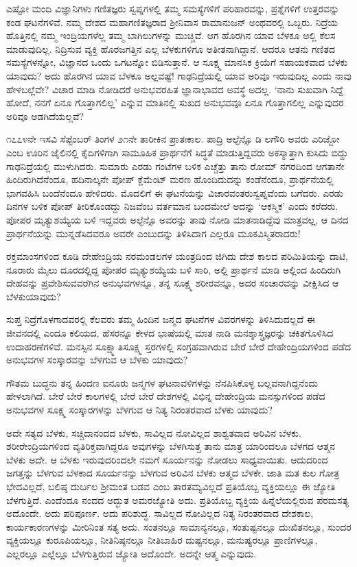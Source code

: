 ಎಷ್ಟೋ ಮಂದಿ ವಿಜ್ಞಾನಿಗಳು ಗಣಿತಜ್ಞರು ಸ್ವಪ್ನಗಳಲ್ಲಿ ತಮ್ಮ ಸಮಸ್ಯೆಗಳಿಗೆ ಪರಿಹಾರವನ್ನು, ಪ್ರಶ್ನೆಗಳಿಗೆ ಉತ್ತರವನ್ನು ಕಂಡ ಘಟನೆಗಳಿವೆ. ನಮ್ಮ ದೇಶದ ಮಹಾಗಣಿತಜ್ಞರಾದ ಶ‍್ರೀನಿವಾಸ ರಾಮಾನುಜನ್ ಅಂಥವರಲ್ಲಿ ಒಬ್ಬರು. ನಿದ್ರೆಯ ಹೊತ್ತಿನಲ್ಲಿ ನಮ್ಮ ಇಂದ್ರಿಯಗಳೆಲ್ಲ ತಮ್ಮ ಬಾಗಿಲುಗಳನ್ನು ಮುಚ್ಚಿವೆ. ಆಗ ಹೊರಗಿನ ಯಾವ ಬೆಳಕೂ ಅಲ್ಲಿ ಕೆಲಸ ಮಾಡುವುದಿಲ್ಲ. ನಿದ್ರಿಸುವ ವ್ಯಕ್ತಿ ಹೊರಜಗತ್ತಿನ ಎಲ್ಲ ಬೆಳಕುಗಳಿಗೂ ಅತೀತನಾಗಿದ್ದಾನೆ. ಆದರೂ ಆತನು ಗಣಿತದ ಸಮಸ್ಯೆಗಳನ್ನೋ, ವಿಜ್ಞಾನದ ಒಂದು ಒಗಟನ್ನೋ ಬಿಡಿಸುತ್ತಾನೆ. ಆ ಸೂಕ್ಷ್ಮ ಮಾನಸಿಕ ಕ್ರಿಯೆಗೆ ಸಹಾಯಕವಾದ ಬೆಳಕು ಯಾವುದು? ಅದು ಹೊರಗಿನ ಯಾವ ಬೆಳಕೂ ಅಲ್ಲವಷ್ಟೆ! ಗಾಢನಿದ್ರೆಯಲ್ಲಿ ಯಾವ ಅರಿವೂ ಇರುವುದಿಲ್ಲ ಎಂದು ನಾವು ಹೇಳಬಲ್ಲೆವೇ? ವಿಚಾರ ಮಾಡಿ ನೋಡಿದರೆ ಅನುಭವರಹಿತ ಜ್ಞಾನಾಭಾವದ ಅವಸ್ಥೆ ಅದಲ್ಲ. ‘ನಾನು ಸುಖವಾಗಿ ನಿದ್ದೆ ಹೋದೆ, ನನಗೆ ಏನೂ ಗೊತ್ತಾಗಲಿಲ್ಲ’ ಎನ್ನುವ ಮಾತಿನಲ್ಲಿ ಸುಖದ ಅನುಭವವೂ ಏನೂ ಗೊತ್ತಾಗಲಿಲ್ಲ ಎನ್ನುವುದರ ಅರಿವೂ ಅಡಗಿದೆಯಲ್ಲವೆ?

೧೭೭೪ನೇ ಇಸವಿ ಸೆಪ್ಟೆಂಬರ್ ತಿಂಗಳ ೨೧ನೇ ತಾರೀಕಿನ ಪ್ರಾತಃಕಾಲ. ಪಾದ್ರಿ ಅಲ್ಫೆನ್ಸೊ ಡಿ ಲಗೌರಿ ಅವರು ಎರಿಜ್ಜೋ ಎಂಬ ಊರಿನ ಜೈಲಿನಲ್ಲಿ ಕೈದಿಗಳಿಗಾಗಿ ಸಾಮೂಹಿಕ ಪ್ರಾರ್ಥನೆಗೆ ಸಿದ್ಧತೆ ಮಾಡುತ್ತಿದ್ದವರು ಅಕಸ್ಮಾತ್ತಾಗಿ ಕುಸಿದು ಬಿದ್ದು ಗಾಢನಿದ್ರೆಯಲ್ಲಿ ಮುಳುಗಿದರು. ಸುಮಾರು ಎರಡು ಗಂಟೆಗಳ ಬಳಿಕ ಎಚ್ಚೆತ್ತು ತಾನು ರೋಮ್ ನಗರದಿಂದ ಆಗತಾನೇ ಹಿಂದಿರುಗಿದೆ\-ನೆಂದೂ, ಹದಿನಾಲ್ಕನೇ ಪೋಪ್ ಕ್ಲೆಮೆಂಟ್ ಮರಣ ಹೊಂದಿದುದನ್ನು ಕಂಡೆನೆಂದೂ, ಪ್ರಾರ್ಥನೆಯಲ್ಲಿ ಭಾಗವಹಿಸಿ ಬಂದೆನೆಂದೂ ಹೇಳಿದರು. ಮೊದಲಿಗೆ ಈ ಘಟನೆಯನ್ನು ವಿಚಾರವಂತರು\break ಸ್ವಪ್ನವೆಂದು ಬಗೆದರು. ಎರಡು ದಿನಗಳ ಬಳಿಕ ಪೋಪ್ ತೀರಿಕೊಂಡದ್ದು ನಿಜವೆಂಬ ವರ್ತಮಾನ ಬಂದಮೇಲೆ ಅದನ್ನು ‘ಆಕಸ್ಮಿಕ’ ಎಂದು ಕರೆದರು. ಪೋಪರ ಮೃತ್ಯುಶಯ್ಯೆಯ ಬಳಿ ಇದ್ದವರು ಅಲ್ಫೆನ್ಸೊ ಅವರನ್ನು ತಾವು ನೋಡಿ ಮಾತನಾಡಿದ್ದೆವು ಮಾತ್ರವಲ್ಲ, ಆ ದಿನದ ಪ್ರಾರ್ಥನೆಯನ್ನು ಮುನ್ನಡೆಸಿದವರೂ ಅವರೇ ಎಂಬುದನ್ನು ತಿಳಿಸಿದಾಗ ಎಲ್ಲರೂ ಮೂಕವಿಸ್ಮಿತರಾದರು!

ರಕ್ತಮಾಂಸಗಳಿಂದ ಕೂಡಿ ದೇಹೇಂದ್ರಿಯ ನರಮಂಡಲಗಳ ಯಂತ್ರದಿಂದ ಜಿಗಿದು ದೇಶ ಕಾಲದ ಪರಿಮಿತಿಯನ್ನು ದಾಟಿ, ನೂರಾರು ಮೈಲು ದೂರದಲ್ಲಿದ್ದ ಪೋಪರ ಮೃತ್ಯುಶಯ್ಯೆಯ ಬಳಿ ಸಾರಿ, ಅಲ್ಲಿ ಪ್ರಾರ್ಥನೆ ಮಾಡಿ ಅಲ್ಲಿಂದ ಹಿಂದಿರುಗಿ ದೇಹವನ್ನು ಪ್ರವೇಶಿಸುವವರೆಗಿನ ಅನುಭವಗಳನ್ನೂ, ತನ್ನ ಸೂಕ್ಷ್ಮ ಶರೀರವನ್ನೂ, ಅದರ ಸಂಚಾರವನ್ನು ವೀಕ್ಷಿಸಿದ ಆ ಬೆಳಕು\break ಯಾವುದು?

ಸುಪ್ತ ನಿದ್ರೆಗೊಳಗಾದವರಲ್ಲಿ ಕೆಲವರು ತಮ್ಮ ಹಿಂದಿನ ಜನ್ಮದ ಘಟನೆಗಳ ವಿವರಗಳನ್ನು ತಿಳಿಸಿದುದಲ್ಲದೆ ಈ ಜೀವನದಲ್ಲಿ ಎಂದೂ ಕಲಿಯದ, ಹೆಸರನ್ನೂ ಕೇಳದ ಭಾಷೆಯಲ್ಲಿ ಮಾತ ನಾಡಿ ಮನಶ್ಶಾಸ್ತ್ರಜ್ಞರನ್ನು ಚಕಿತಗೊಳಿಸಿದ ಉದಾಹರಣೆಗಳಿವೆ. ಮನಸ್ಸಿನ ಸೂಕ್ಷ್ಮಾತಿಸೂಕ್ಷ್ಮ ಸ್ತರಗಳಲ್ಲಿ ಸಂಗ್ರಹವಾಗಿರುವ ಬೇರೆ ಬೇರೆ ದೇಹೇಂದ್ರಿಯಗಳಿಂದ ಪಡೆದ ಅನುಭವಗಳ ಸಂಸ್ಕಾರವನ್ನು ಬೆಳಗುವ ಆ ಬೆಳಕು ಯಾವುದು?

ಗೌತಮ ಬುದ್ಧನು ತನ್ನ ಹಿಂದಣ ಐನೂರು ಜನ್ಮಗಳ ಘಟನಾವಳಿಗಳನ್ನು ನೆನಪಿಸಿಕೊಳ್ಳ ಬಲ್ಲವನಾಗಿದ್ದನೆಂದು ಹೇಳಲಾಗಿದೆ. ಬೇರೆ ಬೇರೆ ಕಾಲಗಳಲ್ಲಿ ಬೇರೆ ಬೇರೆ ದೇಶಗಳಲ್ಲಿ ವಿಭಿನ್ನ ದೇಹೇಂದ್ರಿಯ ಮನಸ್ಸುಗಳಿಂದ ಪಡೆದ ಅನುಭವಗಳ ಸೂಕ್ಷ್ಮ ಸಂಸ್ಕಾರಗಳನ್ನು ಬೆಳಗುವ ಆ ನಿತ್ಯ ನಿರಂತರವಾದ ಬೆಳಕು ಯಾವುದು?

ಅದೇ ಸತ್ಯದ ಬೆಳಕು, ಸಚ್ಚಿದಾನಂದದ ಬೆಳಕು, ಸಾವಿಲ್ಲದ ನೋವಿಲ್ಲದ ಶಾಶ್ವತವಾದ ಅರಿವಿನ ಬೆಳಕು. ಶರೀರೇಂದ್ರಿಯಗಳಿಂದ ವ್ಯತಿರಿಕ್ತವಾಗಿದ್ದರೂ ಅವುಗಳನ್ನು ಬೆಳಗಿಸುತ್ತ ತಾನು ಮಾತ್ರ ಯಾರಿಂದಲೂ ಬೆಳಗದ ಆತ್ಮನ ಬೆಳಕು ಅದೇ. ಆ ಬೆಳಕು ಇರುವುದರಿಂದಲೇ ನಮಗೆ ಸೂರ್ಯನನ್ನು ನೋಡಲು ಸಾಧ್ಯವಾಯಿತು. ಆದುದರಿಂದ ಜಗತ್ತನ್ನು ಬೆಳಗುವ ಬೆಳಕಾದ ಸೂರ್ಯನನ್ನು ಬೆಳಗುವ ಅರಿವಿನ ಬೆಳಕು ಆತ್ಮದ ಬೆಳಕೇ. ಜಾತಿ ಮತ ಕುಲ ಗೋತ್ರ ಭೇದವಿಲ್ಲದೆ, ಬಲಿಷ್ಠ ದುರ್ಬಲ ಶ‍್ರೀಮಂತ ಬಡವ ಎಂಬ ತಾರತಮ್ಯವಿಲ್ಲದೆ ಪ್ರತಿಯೊಬ್ಬ ವ್ಯಕ್ತಿಯಲ್ಲೂ ಈ ಜ್ಯೋತಿ ಬೆಳಗುತ್ತಿದೆ. ಎಂದೆಂದೂ ನಂದದ ಅದ್ಭುತ ಅಮರಜ್ಯೋತಿ ಅದು. ಪ್ರತಿಯೊಬ್ಬ ವ್ಯಕ್ತಿಯ ಹಿನ್ನೆಲೆಯಲ್ಲಿರುವ ಪರಮಸತ್ಯ ಅದೊಂದೇ. ಅದು ಪರಿಪೂರ್ಣ. ಅದು ಪರಿಶುದ್ಧ. ಸಾವಿಲ್ಲದ ನೋವಿಲ್ಲದ ನಿತ್ಯ ನಿರಂತರವಾದ ದೇಶಕಾಲ, ಕಾರ್ಯಕಾರಣಗಳನ್ನು ಮೀರಿನಿಂತ ಸತ್ಯ ಅದು. ಸಂತನಲ್ಲೂ ಸಾಮಾನ್ಯನಲ್ಲೂ, ಸಂತುಷ್ಟನಲ್ಲೂ ದುಃಖಿತನಲ್ಲೂ, ಸುಂದರ ವ್ಯಕ್ತಿ\-ಯಲ್ಲೂ ಕುರೂಪಿಯಲ್ಲೂ, ನೀತಿನಿಷ್ಠನಲ್ಲೂ ನೀತಿಬಾಹಿರ ದುಷ್ಟನಲ್ಲೂ, ಮನುಷ್ಯರಲ್ಲೂ ಪ್ರಾಣಿಗಳಲ್ಲೂ, ಎಲ್ಲರಲ್ಲೂ ಎಲ್ಲೆಲ್ಲೂ ಬೆಳಗುತ್ತಿರುವ ಜ್ಯೋತಿ ಅದೊಂದೇ. ಅದನ್ನೇ ಆತ್ಮ ಎನ್ನುವುದು.


